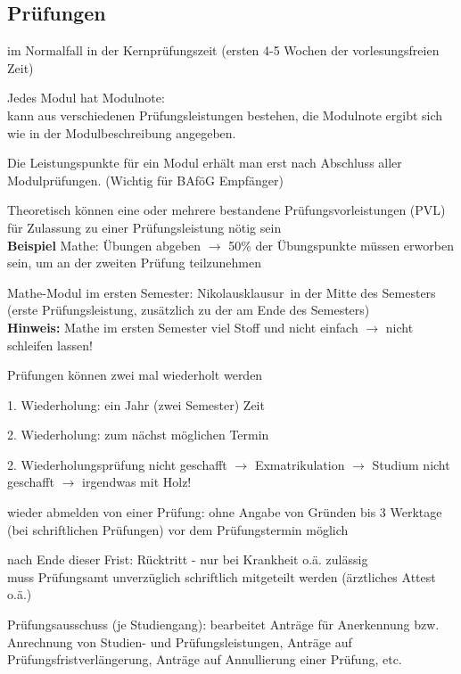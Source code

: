 \documentclass[a4paper,12pt]{report}
\begin{document}
\subsection{Prüfungen}
\begin{itemize*}
	\item im Normalfall in der Kernprüfungszeit (ersten 4-5 Wochen der vorlesungsfreien Zeit)
	\item Jedes Modul hat Modulnote:\\
		kann aus verschiedenen Prüfungsleistungen bestehen, die Modulnote ergibt sich wie in der Modulbeschreibung angegeben.
	\item Die Leistungspunkte für ein Modul erhält man erst nach Abschluss aller Modulprüfungen. (Wichtig für BAföG Empfänger)
	\item Theoretisch können eine oder mehrere bestandene Prüfungsvorleistungen (PVL) für Zulassung zu einer Prüfungsleistung nötig sein\\
		\textbf{Beispiel} Mathe: Übungen abgeben $\rightarrow$ 50\% der Übungspunkte müssen erworben sein, um an der zweiten Prüfung teilzunehmen
	\item Mathe-Modul im ersten Semester: \glqq Nikolausklausur\grqq\ in der Mitte des Semesters (erste Prüfungsleistung, zusätzlich zu der am Ende des Semesters)\\
	\textbf{Hinweis:} Mathe im ersten Semester viel Stoff und nicht einfach $\rightarrow$ nicht schleifen lassen!
	\item Prüfungen können zwei mal wiederholt werden
	\begin{itemize*}
		\item 1. Wiederholung: ein Jahr (zwei Semester) Zeit
		\item 2. Wiederholung: zum nächst möglichen Termin
	\end{itemize*}
	2. Wiederholungsprüfung nicht geschafft $\rightarrow$ Exmatrikulation $\rightarrow$ Studium nicht geschafft $\rightarrow$ irgendwas mit Holz!
	\item wieder abmelden von einer Prüfung: ohne Angabe von Gründen bis 3 Werktage (bei schriftlichen Prüfungen) vor dem Prüfungstermin möglich
	\item nach Ende dieser Frist: Rücktritt - nur bei Krankheit o.ä. zulässig\\ 
		muss Prüfungsamt unverzüglich schriftlich mitgeteilt werden (ärztliches Attest o.ä.)
	\item Prüfungsausschuss (je Studiengang): bearbeitet Anträge für Anerkennung bzw. Anrechnung von Studien- und Prüfungsleistungen, Anträge auf Prüfungsfristverlängerung, Anträge auf Annullierung einer Prüfung, etc.

\end{itemize*}
\end{document}
